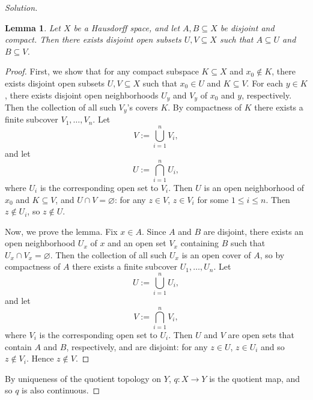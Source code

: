 \documentclass[12pt]{article}
\newtheorem{lemma}[theorem]{Lemma}
\theoremstyle{definition}
\begin{document}
\begin{proof}[Solution]
    \begin{lemma}
        Let $X$ be a Hausdorff space, and let $A , B \subseteq X$ be disjoint and compact. Then there exists disjoint open subsets $U , V \subseteq X$ such that $A \subseteq U$ and $B \subseteq V$.
    \end{lemma}
    \begin{proof}
        First, we show that for any compact subspace $K \subseteq X$ and $x_0 \notin K$, there exists disjoint open subsets $U , V \subseteq X$ such that $x_0 \in U$ and $K \subseteq V$. For each $y \in K$, there exists disjoint open neighborhoods $U_y$ and $V_y$ of $x_0$ and $y$, respectively. Then the collection of all such $V_y$'s covers $K$. By compactness of $K$ there exists a finite subcover $V_1 , \dotsc , V_n$. Let 
        \[
            V := \bigcup\limits_{i = 1}^n V_i,
        \]
        and let
        \[
            U := \bigcap\limits_{i = 1}^n U_i,
        \]
        where $U_i$ is the corresponding open set to $V_i$. Then $U$ is an open neighborhood of $x_0$ and $K \subseteq V$, and $U \cap V = \varnothing$: for any $z \in V$, $z \in V_i$ for some $1 \leq i \leq n$. Then $z \notin U_i$, so $z \notin U$. 
        
        Now, we prove the lemma. Fix $x \in A$. Since $A$ and $B$ are disjoint, there exists an open neighborhood $U_x$ of $x$ and an open set $V_x$ containing $B$ such that $U_x \cap V_x = \varnothing$. Then the collection of all such $U_x$ is an open cover of $A$, so by compactness of $A$ there exists a finite subcover $U_1 , \dotsc , U_n$. Let
        \[
            U := \bigcup\limits_{i = 1}^n U_i,
        \]
        and let
        \[
            V := \bigcap\limits_{i = 1}^n V_i,
        \]
        where $V_i$ is the corresponding open set to $U_i$. Then $U$ and $V$ are open sets that contain $A$ and $B$, respectively, and are disjoint: for any $z \in U$, $z \in U_i$ and so $z \notin V_i$. Hence $z \notin V$. 
    \end{proof}
    By uniqueness of the quotient topology on $Y$, $q : X \to Y$ is the quotient map, and so $q$ is also continuous. 
    

\end{proof}
\end{document}
